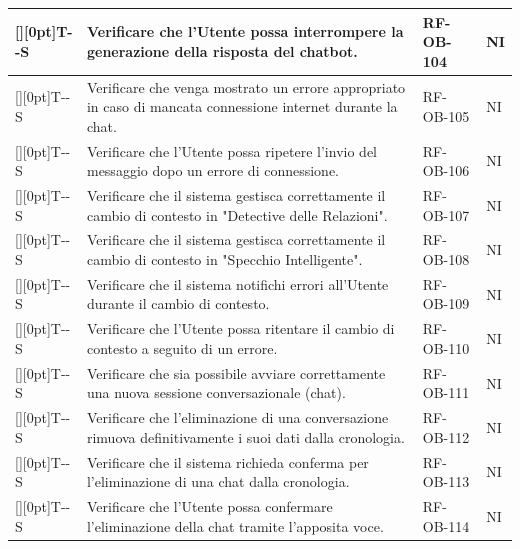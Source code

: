 \documentclass[a4paper,12pt]{article}
\newcounter{testsys}
\newcommand{\systestcode}{%
  \raisebox{0pt}[\height][0pt]{\hypertarget{T-\arabic{testsys}-S}{}}T-\arabic{testsys}-S%
}
\begin{document}
\begin{longtable}{| >{\centering\arraybackslash}p{} | >{\raggedright\arraybackslash}p{} | >{\centering\arraybackslash}p{} | >{\centering\arraybackslash}p{} |}
\stepcounter{testsys} \systestcode & Verificare che l'Utente possa interrompere la generazione della risposta del chatbot. & RF-OB-104 & NI \\
\hline

\stepcounter{testsys} \systestcode & Verificare che venga mostrato un errore appropriato in caso di mancata connessione internet durante la chat. & RF-OB-105 & NI \\
\hline

\stepcounter{testsys} \systestcode & Verificare che l'Utente possa ripetere l'invio del messaggio dopo un errore di connessione. & RF-OB-106 & NI \\
\hline

\stepcounter{testsys} \systestcode & Verificare che il sistema gestisca correttamente il cambio di contesto in "Detective delle Relazioni". & RF-OB-107 & NI \\
\hline

\stepcounter{testsys} \systestcode & Verificare che il sistema gestisca correttamente il cambio di contesto in "Specchio Intelligente". & RF-OB-108 & NI \\
\hline

\stepcounter{testsys} \systestcode & Verificare che il sistema notifichi errori all'Utente durante il cambio di contesto. & RF-OB-109 & NI \\
\hline

\stepcounter{testsys} \systestcode & Verificare che l'Utente possa ritentare il cambio di contesto a seguito di un errore. & RF-OB-110 & NI \\
\hline

\stepcounter{testsys} \systestcode & Verificare che sia possibile avviare correttamente una nuova sessione conversazionale (chat). & RF-OB-111 & NI \\
\hline

\stepcounter{testsys} \systestcode & Verificare che l'eliminazione di una conversazione rimuova definitivamente i suoi dati dalla cronologia. & RF-OB-112 & NI \\
\hline

\stepcounter{testsys} \systestcode & Verificare che il sistema richieda conferma per l'eliminazione di una chat dalla cronologia. & RF-OB-113 & NI \\
\hline

\stepcounter{testsys} \systestcode & Verificare che l'Utente possa confermare l'eliminazione della chat tramite l'apposita voce. & RF-OB-114 & NI \\
\hline


\end{longtable}
\end{document}
